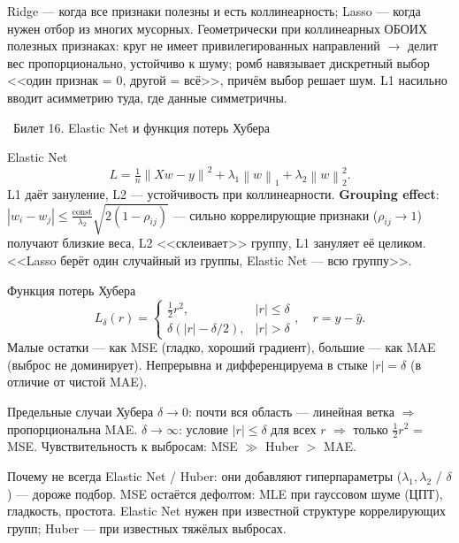 \documentclass[12pt, a4paper]{article}
\newcommand{\bilet}[2]{%
  \vspace{10pt}%
  \noindent\colorbox{qcolor}{\parbox{\dimexpr\linewidth-2\fboxsep\relax}{%
    \color{white}\large\bfseries\strut\ Билет #1. #2%
  }}%
  \nopagebreak\vspace{5pt}\par\nopagebreak%
}
\newcommand{\norm}[1]{\left\lVert #1 \right\rVert}
\newcommand{\wh}[1]{\widehat{#1}}
\begin{document}
\begin{fishkabox}
Ridge --- когда все признаки полезны и есть коллинеарность; Lasso --- когда нужен отбор из многих мусорных. Геометрически при коллинеарных ОБОИХ полезных признаках: круг не имеет привилегированных направлений $\to$ делит вес пропорционально, устойчиво к шуму; ромб навязывает дискретный выбор <<один признак = 0, другой = всё>>, причём выбор решает шум. L1 насильно вводит асимметрию туда, где данные симметричны.
\end{fishkabox}

\bilet{16}{Elastic Net и функция потерь Хубера}

\begin{defbox}{Elastic Net}
\[
  L = \tfrac1n\norm{Xw - y}^2 + \lambda_1\norm{w}_1 + \lambda_2\norm{w}_2^2.
\]
L1 даёт зануление, L2 --- устойчивость при коллинеарности. \textbf{Grouping effect}: $|w_i - w_j| \le \frac{\text{const}}{\lambda_2}\sqrt{2(1-\rho_{ij})}$ --- сильно коррелирующие признаки ($\rho_{ij} \to 1$) получают близкие веса, L2 <<склеивает>> группу, L1 зануляет её целиком. <<Lasso берёт один случайный из группы, Elastic Net --- всю группу>>.
\end{defbox}

\begin{defbox}{Функция потерь Хубера}
\[
  L_\delta(r) = \begin{cases} \tfrac12 r^2, & |r| \le \delta\\ \delta(|r| - \delta/2), & |r| > \delta \end{cases}, \quad r = y - \wh y.
\]
Малые остатки --- как MSE (гладко, хороший градиент), большие --- как MAE (выброс не доминирует). Непрерывна и дифференцируема в стыке $|r| = \delta$ (в отличие от чистой MAE).
\end{defbox}

\begin{propbox}{Предельные случаи Хубера}
$\delta \to 0$: почти вся область --- линейная ветка $\Rightarrow$ пропорциональна MAE. $\delta \to \infty$: условие $|r| \le \delta$ для всех $r$ $\Rightarrow$ только $\tfrac12 r^2$ = MSE. Чувствительность к выбросам: MSE $\gg$ Huber $>$ MAE.
\end{propbox}

\begin{fishkabox}
Почему не всегда Elastic Net / Huber: они добавляют гиперпараметры ($\lambda_1,\lambda_2$ / $\delta$) --- дороже подбор. MSE остаётся дефолтом: MLE при гауссовом шуме (ЦПТ), гладкость, простота. Elastic Net нужен при известной структуре коррелирующих групп; Huber --- при известных тяжёлых выбросах.
\end{fishkabox}
\end{document}
